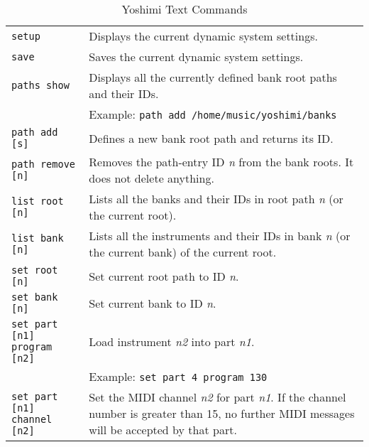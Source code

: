    \begin{table}[H]
      \centering
      \caption{Yoshimi Text Commands}
      \label{table:yoshimi_text_commands}
      \begin{tabular}{l l}
         \texttt{setup} &
            Displays the current dynamic system settings. \\

         \texttt{save} &
            Saves the current dynamic system settings. \\

         \texttt{paths show} &
            Displays all the currently defined bank root paths and their IDs. \\

         & Example:  \texttt{path add /home/music/yoshimi/banks} \\

         \texttt{path add [s]} &
            Defines a new bank root path and returns its ID. \\

         \texttt{path remove [n]} &
            Removes the path-entry ID \textsl{n} from the bank roots. 
            It does not delete anything. \\

         \texttt{list root [n]} &
            Lists all the banks and their IDs in root path \textsl{n} (or the
            current root). \\

         \texttt{list bank [n]} &
            Lists all the instruments and their IDs in bank \textsl{n} (or the
            current bank) of the current root. \\

         \texttt{set root [n]} &
            Set current root path to ID \textsl{n}. \\

         \texttt{set bank [n]} &
            Set current bank to ID \textsl{n}. \\

         \texttt{set part [n1] program [n2]} &
            Load instrument \textsl{n2} into part \textsl{n1}. \\

         & Example: \texttt{set part 4 program 130} \\

         \texttt{set part [n1] channel [n2]} &
            Set the MIDI channel \textsl{n2} for part \textsl{n1}.
            If the channel number is greater than 15, no further MIDI
            messages will be accepted by that part. \\


\end{tabular}
\end{table}

